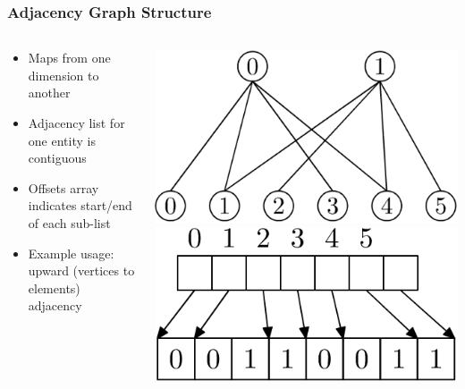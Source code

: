 \documentclass{beamer}
\begin{document}
\begin{frame}
\frametitle{Adjacency Graph Structure}
\begin{columns}[T]
\begin{column}{.5\textwidth}
\begin{itemize}
\item Maps from one dimension to another
\item Adjacency list for one entity is contiguous
\item Offsets array indicates start/end of each sub-list
\item Example usage: upward (vertices to elements) adjacency
\end{itemize}
\end{column}
\begin{column}{.5\textwidth}
\includegraphics[width=.8\textwidth]{graph.png}
\vspace{1.5cm}
\includegraphics[width=.8\textwidth]{offsets.png}
\end{column}
\end{columns}
\end{frame}
\end{document}
